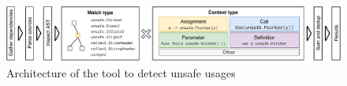 \begin{figure}[htp!]
    \centering
    \includegraphics[width=\textwidth]{assets/figures/chapter4/go-geiger-architecture.pdf}
    \caption{Architecture of the \toolGeiger{} tool to detect unsafe usages}
    \label{fig:go-geiger-architecture}
\end{figure}
